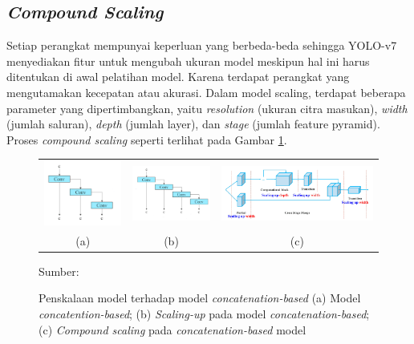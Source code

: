
    \subsection{\textit{Compound Scaling}}
    Setiap perangkat mempunyai keperluan yang berbeda-beda sehingga YOLO-v7 menyediakan fitur untuk mengubah ukuran model meskipun hal ini harus ditentukan di awal pelatihan model. Karena terdapat perangkat yang mengutamakan kecepatan atau akurasi. Dalam model scaling, terdapat beberapa parameter yang dipertimbangkan, yaitu \textit{resolution} (ukuran citra masukan), \textit{width} (jumlah saluran), \textit{depth} (jumlah layer), dan \textit{stage} (jumlah feature pyramid). Proses \textit{compound scaling} seperti terlihat pada Gambar \ref{fig:compound-scaling}.
    
    \begin{figure}[H]
        \centering
        \begin{tabular}{ccc}
            \includegraphics[width=3cm]{../img/Compound Scaling Concatenation-Based Model - Latex.PNG}
            &
            \includegraphics[width=3cm]{../img/Compound Scaling Scaled Up - Latex.PNG}
            &
            \includegraphics[width=6cm]{../img/Compound Scaling Up Depth and Width - Latex.PNG}\\
            (a) &(b) &(c)\\
        \end{tabular}
        \caption{Penskalaan model terhadap model \textit{concatenation-based} (a) Model \textit{concatention-based}; (b) \textit{Scaling-up} pada model \textit{concatenation-based}; (c) \textit{Compound scaling} pada \textit{concatenation-based} model}
        \label{fig:compound-scaling}
        Sumber: \citep{Wang2022}
    \end{figure}

